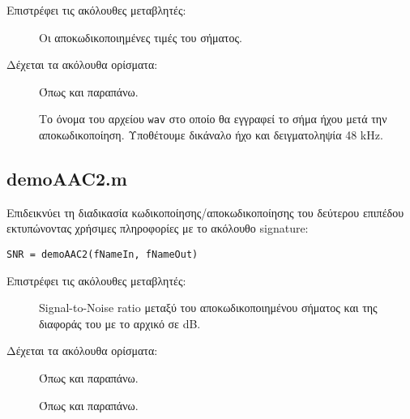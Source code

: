 \noindent Επιστρέφει τις ακόλουθες μεταβλητές:
\begin{description}
  \item[] Οι αποκωδικοποιημένες τιμές του σήματος.
\end{description}

\noindent Δέχεται τα ακόλουθα ορίσματα:
\begin{description}
\item[] Όπως και παραπάνω.
\item[] Το όνομα του αρχείου \verb|wav| στο οποίο θα εγγραφεί το
	σήμα ήχου μετά την αποκωδικοποίηση. Υποθέτουμε δικάναλο ήχο και
	δειγματοληψία 48 kHz.
\end{description}

\subsection*{demoAAC2.m}
Επιδεικνύει τη διαδικασία κωδικοποίησης/αποκωδικοποίησης του δεύτερου επιπέδου
εκτυπώνοντας χρήσιμες πληροφορίες με το ακόλουθο signature:
\begin{center}
	\verb|SNR = demoAAC2(fNameIn, fNameOut)|
\end{center}

\noindent Επιστρέφει τις ακόλουθες μεταβλητές:
\begin{description}
\item[] Signal-to-Noise ratio μεταξύ του αποκωδικοποιημένου σήματος και
	της διαφοράς του με το αρχικό σε dB.
\end{description}

\noindent Δέχεται τα ακόλουθα ορίσματα:
\begin{description}
\item[] Όπως και παραπάνω.
\item[] Όπως και παραπάνω.
\end{description}
